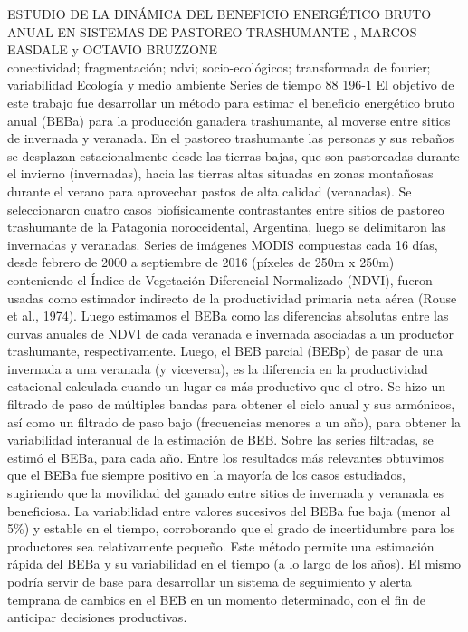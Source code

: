 \A
{ESTUDIO DE LA DINÁMICA DEL BENEFICIO ENERGÉTICO BRUTO ANUAL EN SISTEMAS DE PASTOREO TRASHUMANTE}
{, MARCOS EASDALE y OCTAVIO BRUZZONE}
{
\\}
{conectividad; fragmentación; ndvi; socio-ecológicos; transformada de fourier; variabilidad} 
 {Ecología y medio ambiente} 
 {Series de tiempo} 
 {88} 
 {196-1}
{El objetivo de este trabajo fue desarrollar un método para estimar el beneficio energético bruto anual (BEBa) para la producción ganadera trashumante, al moverse entre sitios de invernada y veranada. En el pastoreo trashumante las personas y sus rebaños se desplazan estacionalmente desde las tierras bajas, que son pastoreadas durante el invierno (invernadas), hacia las tierras altas situadas en zonas montañosas durante el verano para aprovechar pastos de alta calidad (veranadas). Se seleccionaron cuatro casos biofísicamente contrastantes entre sitios de pastoreo trashumante de la Patagonia noroccidental, Argentina, luego se delimitaron las invernadas y veranadas. Series de imágenes MODIS compuestas cada 16 días, desde febrero de 2000 a septiembre de 2016 (píxeles de 250m x 250m) conteniendo el Índice de Vegetación Diferencial Normalizado (NDVI), fueron usadas como estimador indirecto de la productividad primaria neta aérea (Rouse et al., 1974). Luego estimamos el BEBa como las diferencias absolutas entre las curvas anuales de NDVI de cada veranada e invernada asociadas a un productor trashumante, respectivamente. Luego, el BEB parcial (BEBp) de pasar de una invernada a una veranada (y viceversa), es la diferencia en la productividad estacional calculada cuando un lugar es más productivo que el otro. Se hizo un filtrado de paso de múltiples bandas para obtener el ciclo anual y sus armónicos, así como un filtrado de paso bajo (frecuencias menores a un año), para obtener la variabilidad interanual de la estimación de BEB. Sobre las series filtradas, se estimó el BEBa, para cada año. Entre los resultados más relevantes obtuvimos que el BEBa fue siempre positivo en la mayoría de los casos estudiados, sugiriendo que la movilidad del ganado entre sitios de invernada y veranada es beneficiosa. La variabilidad entre valores sucesivos del BEBa fue baja (menor al 5\%) y estable en el tiempo, corroborando que el grado de incertidumbre para los productores sea relativamente pequeño. Este método permite una estimación rápida del BEBa y su variabilidad en el tiempo (a lo largo de los años). El mismo podría servir de base para desarrollar un sistema de seguimiento y alerta temprana de cambios en el BEB en un momento determinado, con el fin de anticipar decisiones productivas. }
